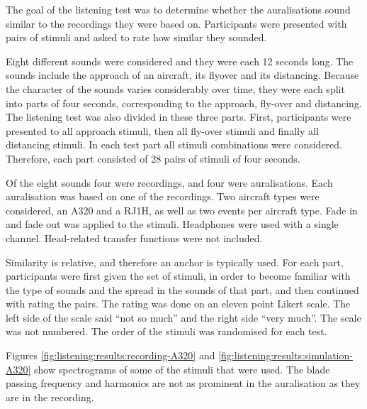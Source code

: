 The goal of the listening test was to determine whether the auralisations sound
similar to the recordings they were based on. Participants were presented with
pairs of stimuli and asked to rate how similar they sounded.


Eight different sounds were considered and they were each 12 seconds long. The
sounds include the approach of an aircraft, its flyover and its distancing.
Because the character of the sounds varies considerably over time, they were
each split into parts of four seconds, corresponding to the approach, fly-over
and distancing. The listening test was also divided in these three parts. First,
participants were presented to all approach stimuli, then all fly-over stimuli
and finally all distancing stimuli. In each test part all stimuli combinations
were considered. Therefore, each part consisted of 28 pairs of stimuli of four
seconds.

Of the eight sounds four were recordings, and four were auralisations. Each
auralisation was based on one of the recordings. Two aircraft types were
considered, an A320 and a RJ1H, as well as two events per aircraft type.
Fade in and fade out was applied to the stimuli. Headphones were used with a
single channel. Head-related transfer functions were not included.

Similarity is relative, and therefore an anchor is typically used. For each
part, participants were first given the set of stimuli, in order to become
familiar with the type of sounds and the spread in the sounds of that part, and
then continued with rating the pairs. The rating was done on an eleven point
Likert scale. The left side of the scale said ``not so much'' and the right side
``very much''. The scale was not numbered. The order of the stimuli was
randomised for each test.

Figures \ref{fig:listening:results:recording-A320} and
\ref{fig:listening:results:simulation-A320} show spectrograms of some of the stimuli
that were used. The blade passing frequency and harmonics are not as prominent
in the auralisation as they are in the recording.

